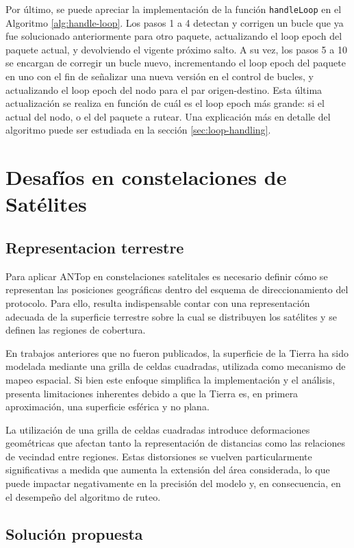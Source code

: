 Por último, se puede apreciar la implementación de la función \texttt{handleLoop} en el Algoritmo \ref{alg:handle-loop}. Los pasos 1 a 4 detectan y corrigen un bucle que ya fue solucionado anteriormente para otro paquete, actualizando el loop epoch del paquete actual, y devolviendo el vigente próximo salto. A su vez, los pasos 5 a 10 se encargan de corregir un bucle nuevo, incrementando el loop epoch del paquete en uno con el fin de señalizar una nueva versión en el control de bucles, y actualizando el loop epoch del nodo para el par origen-destino. Esta última actualización se realiza en función de cuál es el loop epoch más grande: si el actual del nodo, o el del paquete a rutear. Una explicación más en detalle del algoritmo puede ser estudiada en la sección \ref{sec:loop-handling}.



\section{Desafíos en constelaciones de Satélites}
\subsection{Representacion terrestre}

Para aplicar ANTop en constelaciones satelitales es necesario definir cómo se representan las posiciones geográficas dentro del esquema de direccionamiento del protocolo. Para ello, resulta indispensable contar con una representación adecuada de la superficie terrestre sobre la cual se distribuyen los satélites y se definen las regiones de cobertura.

En trabajos anteriores que no fueron publicados, la superficie de la Tierra ha sido modelada mediante una grilla de celdas cuadradas, utilizada como mecanismo de mapeo espacial. Si bien este enfoque simplifica la implementación y el análisis, presenta limitaciones inherentes debido a que la Tierra es, en primera aproximación, una superficie esférica y no plana.

La utilización de una grilla de celdas cuadradas introduce deformaciones geométricas que afectan tanto la representación de distancias como las relaciones de vecindad entre regiones. Estas distorsiones se vuelven particularmente significativas a medida que aumenta la extensión del área considerada, lo que puede impactar negativamente en la precisión del modelo y, en consecuencia, en el desempeño del algoritmo de ruteo.

\subsection{Solución propuesta}

